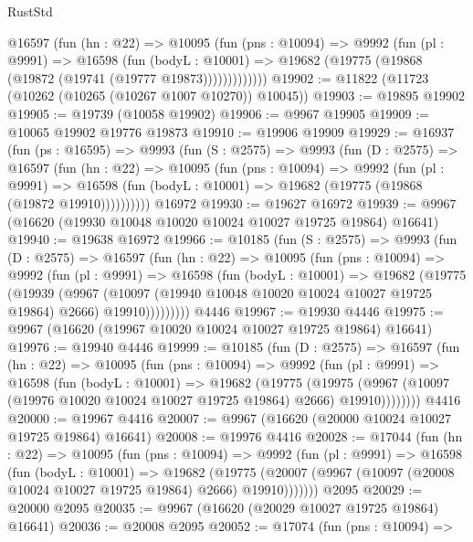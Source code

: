 \begin{lexlean}{RustStd}
\begin{coremodule}
{\begin{coremodule}
{{{{{{{{{{{{{{{{{{{{{{{{{{{{{{{{{{{{{{{{{{{{{{{{{{{{{{{{{{{{{{{{{{{{{{{{{{{{{{          @16597
            (fun (hn : @22) =>
            @10095
              (fun (pns : @10094) =>
              @9992
                (fun (pl : @9991) =>
                @16598
                  (fun (bodyL : @10001) =>
                  @19682 (@19775 (@19868 (@19872 (@19741 (@19777 @19873)))))))))))))
@19902 := @11822 (@11723 (@10262 (@10265 (@10267 @1007 @10270)) @10045))
@19903 := @19895 @19902
@19905 := @19739 (@10058 @19902)
@19906 := @9967 @19905
@19909 := @10065 @19902 @19776 @19873
@19910 := @19906 @19909
@19929 := @16937
    (fun (ps : @16595) =>
    @9993
      (fun (S : @2575) =>
      @9993
        (fun (D : @2575) =>
        @16597
          (fun (hn : @22) =>
          @10095
            (fun (pns : @10094) =>
            @9992
              (fun (pl : @9991) =>
              @16598 (fun (bodyL : @10001) => @19682 (@19775 (@19868 (@19872 @19910))))))))))
    @16972
@19930 := @19627 @16972
@19939 := @9967 (@16620 (@19930 @10048 @10020 @10024 @10027 @19725 @19864) @16641)
@19940 := @19638 @16972
@19966 := @10185
    (fun (S : @2575) =>
    @9993
      (fun (D : @2575) =>
      @16597
        (fun (hn : @22) =>
        @10095
          (fun (pns : @10094) =>
          @9992
            (fun (pl : @9991) =>
            @16598
              (fun (bodyL : @10001) =>
              @19682
                (@19775
                  (@19939
                    (@9967
                      (@10097 (@19940 @10048 @10020 @10024 @10027 @19725 @19864) @2666)
                      @19910)))))))))
    @4446
@19967 := @19930 @4446
@19975 := @9967 (@16620 (@19967 @10020 @10024 @10027 @19725 @19864) @16641)
@19976 := @19940 @4446
@19999 := @10185
    (fun (D : @2575) =>
    @16597
      (fun (hn : @22) =>
      @10095
        (fun (pns : @10094) =>
        @9992
          (fun (pl : @9991) =>
          @16598
            (fun (bodyL : @10001) =>
            @19682
              (@19775
                (@19975
                  (@9967 (@10097 (@19976 @10020 @10024 @10027 @19725 @19864) @2666) @19910))))))))
    @4416
@20000 := @19967 @4416
@20007 := @9967 (@16620 (@20000 @10024 @10027 @19725 @19864) @16641)
@20008 := @19976 @4416
@20028 := @17044
    (fun (hn : @22) =>
    @10095
      (fun (pns : @10094) =>
      @9992
        (fun (pl : @9991) =>
        @16598
          (fun (bodyL : @10001) =>
          @19682
            (@19775 (@20007 (@9967 (@10097 (@20008 @10024 @10027 @19725 @19864) @2666) @19910)))))))
    @2095
@20029 := @20000 @2095
@20035 := @9967 (@16620 (@20029 @10027 @19725 @19864) @16641)
@20036 := @20008 @2095
@20052 := @17074
    (fun (pns : @10094) =>
}}}}}}}}}}}}}}}}}}}}}}}}}}}}}}}}}}}}}}}}}}}}}}}}}}}}}}}}}}}}}}}}}}}}}}}}}}}}}}
\end{coremodule}}
\end{coremodule}
\end{lexlean}
